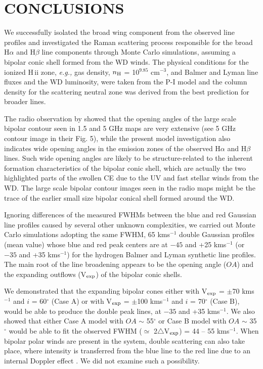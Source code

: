 \documentclass[a4paper,fleqn,usenatbib,useAMS]{mnras}
\def\eg{{\it e.g.,} }
\def\ha{H{$\alpha$}}
\def\hb{H{$\beta$}}
\def\hii{H\,{\sc ii}}
\def\niii{N\,{\sc iii}}
\def\kms{km\hspace{1pt}s$^{-1}$}
\begin{document}
{{\section{CONCLUSIONS}

We successfully isolated  the broad wing component from the observed line profiles and investigated the Raman scattering process responsible for the  broad {\ha} and {\hb} line components through Monte Carlo simulations, assuming a bipolar conic shell formed from the WD winds. The physical conditions for the ionized {\hii} zone, \eg gas density, $n_{\rm H}$ = 10$^{9.85}$ cm$^{-3}$, and Balmer and Lyman line fluxes  and the WD luminosity, were taken from the P-I model and the column density for the scattering neutral zone was derived from the best prediction for broader lines.
{%

The radio observation by \citet{ken91} showed that the opening angles of the large scale bipolar contour seen in 1.5 and 5 GHz maps are very extensive (see 5 GHz contour image in their Fig. 5), while the present model investigation also indicates wide opening angles in the emission zones of the observed {\ha} and {\hb} lines. Such wide opening angles are likely to be structure-related to the inherent formation characteristics of the bipolar conic shell, which are actually the two highlighted parts of the swollen CE due to the UV and fast stellar winds from the WD. The large scale bipolar contour images seen in the radio maps might be the trace of the earlier small size bipolar conical shell formed around the WD.



Ignoring differences of the measured FWHMs between the blue and red Gaussian line profiles caused by several other unknown complexities, we carried out Monte Carlo simulations adopting the same FWHM, 65 {\kms} double Gaussian profiles (mean value) whose blue and red peak centers are at $-45$ and +25 {\kms} (or $-35$ and +35 {\kms}) for the hydrogen Balmer and Lyman synthetic line profiles. The main root of the line broadening appears to be the opening angle ($OA$) and the expanding outflows (V$_{\rm exp}$) of the bipolar conic shells.

We demonstrated that the expanding bipolar cones either with V$_{\rm exp}$ = $\pm$70 {\kms} and $i$ = 60$^{\circ}$ (Case A) or with V$_{\rm exp}$ = $\pm$100 {\kms} and $i$ = 70$^{\circ}$ (Case B), would be able to produce the double peak lines, at $-35$ and +35 {\kms}.
We also showed that either Case A model with $OA$ $\sim$ 55$^{\circ}$ or Case B model with  $OA$ $\sim$ 35$^{\circ}$ would be able to fit the observed FWHM ($\simeq$ 2$\triangle$V$_{\rm exp}$) = 44 -- 55 {\kms}. When bipolar polar winds are present in the system, double scattering can also take place, where intensity is transferred from the blue line to the red line due to an internal Doppler effect \citep{yoo02}.
We did not examine such a possibility.


}}}
\end{document}

